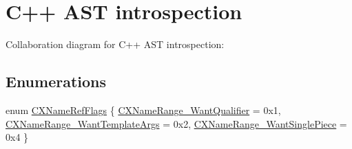 \hypertarget{group__CINDEX__CPP}{}\section{C++ A\+ST introspection}
\label{group__CINDEX__CPP}
Collaboration diagram for C++ A\+ST introspection\+:
\subsection*{Enumerations}
\begin{DoxyCompactItemize}
\item 
enum \hyperlink{group__CINDEX__CPP_gab9c36c971a7241dccf6a54741b66a5ee}{C\+X\+Name\+Ref\+Flags} \{ \hyperlink{group__CINDEX__CPP_ggab9c36c971a7241dccf6a54741b66a5eea9f7f2c26ed147d0c85b475f66d5213e3}{C\+X\+Name\+Range\+\_\+\+Want\+Qualifier} = 0x1, 
\hyperlink{group__CINDEX__CPP_ggab9c36c971a7241dccf6a54741b66a5eea286e77db7ed354a06309770f1a8e6efd}{C\+X\+Name\+Range\+\_\+\+Want\+Template\+Args} = 0x2, 
\hyperlink{group__CINDEX__CPP_ggab9c36c971a7241dccf6a54741b66a5eea4a5d0e263577af7d7a0ba46ad0dcf8d8}{C\+X\+Name\+Range\+\_\+\+Want\+Single\+Piece} = 0x4
 \}
\end{DoxyCompactItemize}
